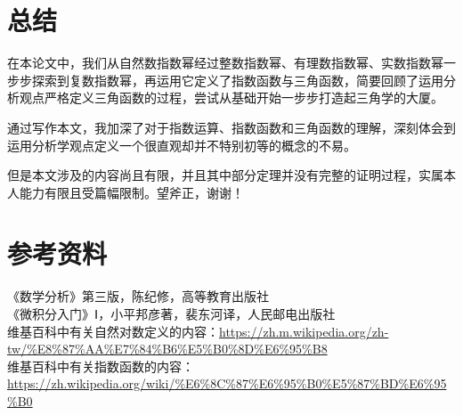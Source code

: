 \documentclass[UTF8,12pt]{ctexart}
\begin{document}
\section{总结}
    在本论文中，我们从自然数指数幂经过整数指数幂、有理数指数幂、实数指数幂一步步探索到复数指数幂，再运用它定义了指数函数与三角函数，简要回顾了运用分析观点严格定义三角函数的过程，尝试从基础开始一步步打造起三角学的大厦。
    
    通过写作本文，我加深了对于指数运算、指数函数和三角函数的理解，深刻体会到运用分析学观点定义一个很直观却并不特别初等的概念的不易。
    
    但是本文涉及的内容尚且有限，并且其中部分定理并没有完整的证明过程，实属本人能力有限且受篇幅限制。望斧正，谢谢！
\section{参考资料}
\setlength{\parindent}{0pt}
    《数学分析》第三版，陈纪修，高等教育出版社\\
    《微积分入门》Ⅰ，小平邦彦著，裴东河译，人民邮电出版社\\
    维基百科中有关自然对数定义的内容：\url{https://zh.m.wikipedia.org/zh-tw/%E8%87%AA%E7%84%B6%E5%B0%8D%E6%95%B8}\\
    维基百科中有关指数函数的内容：\url{https://zh.wikipedia.org/wiki/%E6%8C%87%E6%95%B0%E5%87%BD%E6%95%B0}
\end{document}
